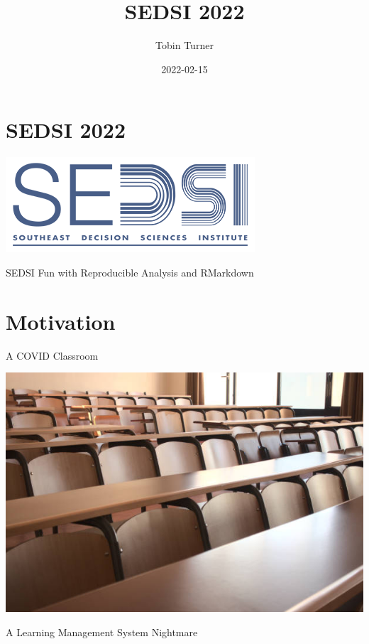 \documentclass[
]{book}
\title{SEDSI 2022}
\author{Tobin Turner}
\date{2022-02-15}
\begin{document}
\maketitle

{
\setcounter{tocdepth}{1}
\tableofcontents
}
\hypertarget{sedsi-2022}{%
\chapter{SEDSI 2022}\label{sedsi-2022}}

\begin{center}\includegraphics{_images/SEDSI} \end{center}

SEDSI Fun with Reproducible Analysis and RMarkdown

\hypertarget{motivation}{%
\chapter{Motivation}\label{motivation}}

A COVID Classroom

\begin{center}\includegraphics{_images/empty_class} \end{center}

A Learning Management System Nightmare
\end{document}
